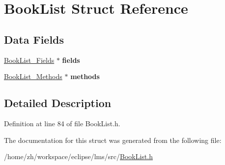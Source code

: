 \hypertarget{structBookList}{\section{Book\-List Struct Reference}
\label{structBookList}
}
\subsection*{Data Fields}
\begin{DoxyCompactItemize}
\item 
\hypertarget{structBookList_a6939a59f97529f265e8a693b70070162}{\hyperlink{structBookList__Fields}{Book\-List\-\_\-\-Fields} $\ast$ {\bfseries fields}}\label{structBookList_a6939a59f97529f265e8a693b70070162}

\item 
\hypertarget{structBookList_ae155960c50bff46036ebfa631b9d7b6c}{\hyperlink{structBookList__Methods}{Book\-List\-\_\-\-Methods} $\ast$ {\bfseries methods}}\label{structBookList_ae155960c50bff46036ebfa631b9d7b6c}

\end{DoxyCompactItemize}


\subsection{Detailed Description}


Definition at line 84 of file Book\-List.\-h.



The documentation for this struct was generated from the following file\-:\begin{DoxyCompactItemize}
\item 
/home/zh/workspace/eclipse/lms/src/\hyperlink{BookList_8h}{Book\-List.\-h}\end{DoxyCompactItemize}

